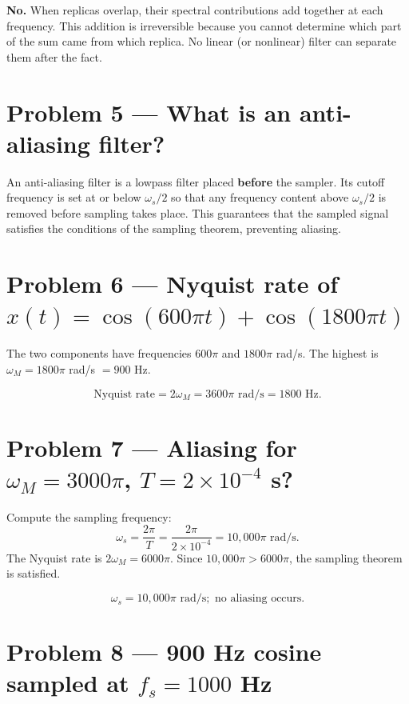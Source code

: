 \documentclass[11pt]{article}
\newcommand{\boxans}[1]{\[\boxed{#1}\]}
\begin{document}
\textbf{No.} When replicas overlap, their spectral contributions add together at each frequency. This addition is irreversible because you cannot determine which part of the sum came from which replica. No linear (or nonlinear) filter can separate them after the fact.

\section*{Problem 5 --- What is an anti-aliasing filter?}

An anti-aliasing filter is a lowpass filter placed \textbf{before} the sampler. Its cutoff frequency is set at or below $\omega_s/2$ so that any frequency content above $\omega_s/2$ is removed before sampling takes place. This guarantees that the sampled signal satisfies the conditions of the sampling theorem, preventing aliasing.

\section*{Problem 6 --- Nyquist rate of \texorpdfstring{$x(t) = \cos(600\pi t) + \cos(1800\pi t)$}{x(t) = cos(600 pi t) + cos(1800 pi t)}}

The two components have frequencies $600\pi$ and $1800\pi$ rad/s. The highest is $\omega_M = 1800\pi$ rad/s $= 900$ Hz.

\boxans{\text{Nyquist rate} = 2\omega_M = 3600\pi \text{ rad/s} = 1800 \text{ Hz}.}

\section*{Problem 7 --- Aliasing for \texorpdfstring{$\omega_M = 3000\pi$}{omega\_M = 3000 pi}, \texorpdfstring{$T = 2\times 10^{-4}$}{T = 2e-4} s?}

Compute the sampling frequency:
\[
\omega_s = \frac{2\pi}{T} = \frac{2\pi}{2 \times 10^{-4}} = 10{,}000\pi \text{ rad/s}.
\]
The Nyquist rate is $2\omega_M = 6000\pi$. Since $10{,}000\pi > 6000\pi$, the sampling theorem is satisfied.

\boxans{\omega_s = 10{,}000\pi \text{ rad/s}; \text{ no aliasing occurs.}}

\section*{Problem 8 --- 900 Hz cosine sampled at \texorpdfstring{$f_s = 1000$}{fs = 1000} Hz}
\end{document}
